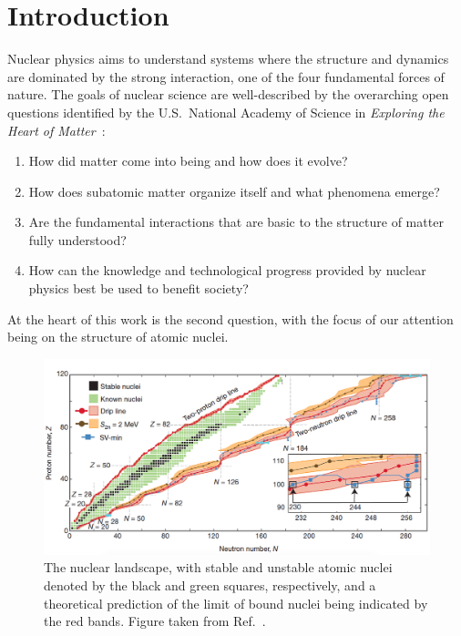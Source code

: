 \chapter{Introduction}

Nuclear physics aims to understand systems
where the structure and dynamics are dominated by the strong interaction,
one of the four fundamental forces of nature.
The goals of nuclear science are well-described by the overarching open questions
identified by the U.S.~National Academy of Science in \textit{Exploring the Heart of Matter}~\cite{NRC13heartofmatter}:
\begin{enumerate}
  \item How did matter come into being and how does it evolve?
  \item How does subatomic matter organize itself and what phenomena emerge?
  \item Are the fundamental interactions that are basic to the structure of matter fully understood?
  \item How can the knowledge and technological progress provided by nuclear physics best be used to benefit society?
\end{enumerate}
At the heart of this work is the second question,
with the focus of our attention being on the structure of atomic nuclei.

\begin{figure}[t]
  \centering
  \includegraphics[width=1.0\textwidth]{proposal/doc/images/external/nuclear_landscape.png}
  \caption[
    The nuclear landscape,
    with stable and unstable atomic nuclei denoted by the black and green squares, respectively,
    and a theoretical prediction of the limit of bound nuclei being indicated by the red bands.
  ]{
    The nuclear landscape,
    with stable and unstable atomic nuclei denoted by the black and green squares, respectively,
    and a theoretical prediction of the limit of bound nuclei being indicated by the red bands.
    Figure taken from Ref.~\cite{Erle12limits}.
  }\label{fig:nuclear_landscape}
\end{figure}

